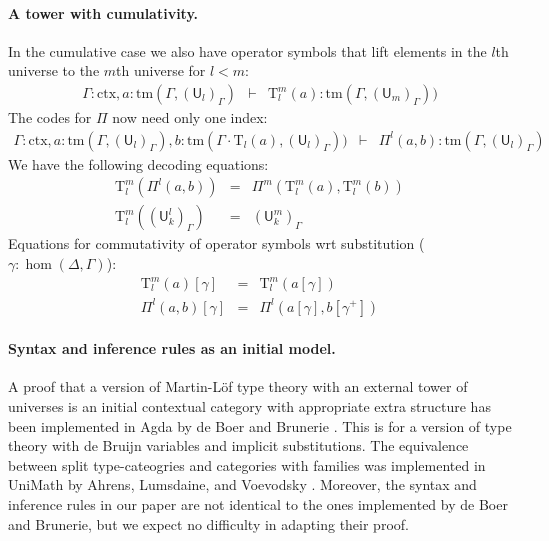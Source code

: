 \documentclass[11pt,a4paper]{article}
\theoremstyle{definition}
\newcommand{\UU}{\mathsf{U}}
\def\UU{\mathsf{U}}
\newcommand{\N}{\mathsf{N}}
\def\Pihat{\Pi}
\newcommand{\ctx}{\mathrm{ctx}}
\newcommand{\tm}{\mathrm{tm}}
\def\U{\mathsf{U}}
\newcommand{\Ta}{\mathrm{T}}
\begin{document}
\paragraph{A tower with cumulativity.}
In the cumulative case we also have operator symbols that lift elements in the $l$th universe to the $m$th universe for $l < m$:
\begin{eqnarray*}
\Gamma : \ctx, a : \tm(\Gamma,(\U_{l})_\Gamma) &\vdash& {\Ta^m_{l}}(a) : \tm(\Gamma,(\U_{m})_\Gamma))
\end{eqnarray*}
The codes for $\Pi$ now need only one index:
\begin{eqnarray*}
\Gamma : \ctx,
a : \tm(\Gamma,(\U_{l})_\Gamma),
b :  \tm(\Gamma \cdot \Ta_{l}(a), (\U_{l})_\Gamma))
&\vdash&
 \Pihat^{l}(a,b) : \tm(\Gamma,(\U_{l})_\Gamma)
\end{eqnarray*}
We have the following decoding equations:
\begin{eqnarray*}
\Ta^m_{l}(\Pi^{l}(a,b)) &=& \Pi^m(\Ta^m_l(a),\Ta^m_l(b))\\
\Ta^m_l((\UU^l_k)_\Gamma) &=& (\UU^m_k)_\Gamma
\end{eqnarray*}
Equations for commutativity of operator symbols wrt substitution ($\gamma : \hom(\Delta,\Gamma)$):
\begin{eqnarray*}
\Ta^m_l(a) [ \gamma ] &=& \Ta^m_l(a[ \gamma ] )\\
\Pi^{l}(a,b)[ \gamma ] &=& \Pi^{l}(a [ \gamma ], b[ \gamma^+ ])
\end{eqnarray*}

\paragraph{Syntax and inference rules as an initial model.} A proof that a version of Martin-Löf type theory with an external tower of universes  is an initial contextual category with appropriate extra structure has been implemented in Agda by de Boer and Brunerie \cite{Brunerie:initiality,deBoer:lic}. This is for a version of type theory with de Bruijn variables and implicit substitutions. The equivalence between split type-cateogries and categories with families was implemented in UniMath by Ahrens, Lumsdaine, and Voevodsky \cite{AhrensLV18}. Moreover, the syntax and inference rules in our paper \cite{BezemCDE22} are not identical to the ones implemented by de Boer and Brunerie, but we expect no difficulty in adapting their proof.
\end{document}
